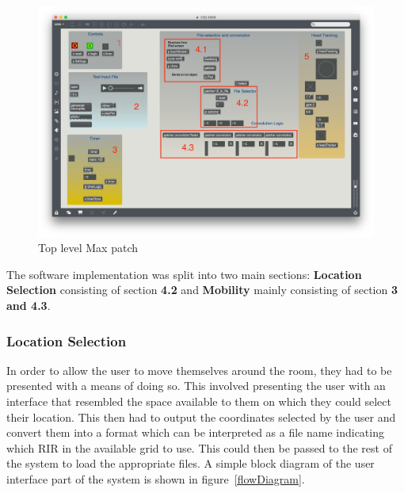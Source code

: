 \documentclass[../../main.tex]{subfiles}
\begin{document}
				\begin{figure}[H]
					\centerline{\includegraphics[scale = 0.4]{Sections/Implementation/Max/images/Max/MyPatch_Edit.png}}
					\caption{Top level Max patch}
					\label{myPatch}
				\end{figure}

		

				The software implementation was split into two main sections: \textbf{Location Selection} consisting of section \textbf{4.2} and \textbf{Mobility} mainly consisting of section \textbf{3 and 4.3}.



		\subsubsection{Location Selection}
		\label{locationSelection}

			In order to allow the user to move themselves around the room, they had to be presented with a means of doing so. This involved presenting the user with an interface that resembled the space available to them on which they could select their location. This then had to output the coordinates selected by the user and convert them into a format which can be interpreted as a file name indicating which \ac{RIR} in the available grid to use. This could then be passed to the rest of the system to load the appropriate files. A simple block diagram of the user interface part of the system is shown in figure~\ref{flowDiagram}.
\end{document}
